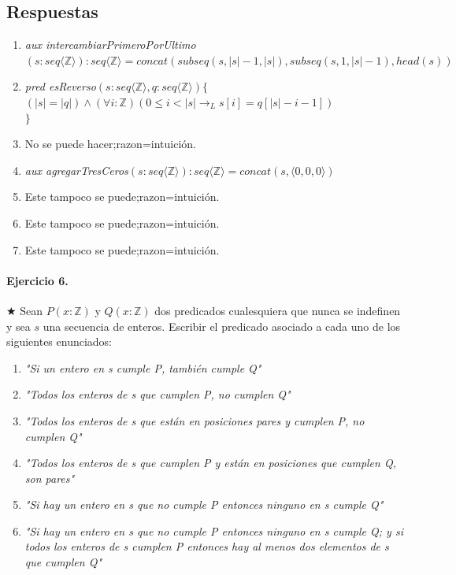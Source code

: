 \documentclass[a4paper]{article}
\begin{document}
\subsection*{Respuestas}
\begin{enumerate}[label=\alph*)]
\item \textit{aux intercambiarPrimeroPorUltimo}$(s: seq\langle \mathbb{Z} \rangle):seq\langle \mathbb{Z} \rangle = concat(subseq(s,|s|-1,|s|),subseq(s,1,|s|-1),head(s))$ 
\item \textit{pred esReverso}$(s: seq\langle \mathbb{Z} \rangle , q:seq\langle \mathbb{Z} \rangle)\{$\\
\hspace*{6mm}$(|s| = |q| )\wedge (\forall i:\mathbb{Z})(0\leq i<\vert s\vert \rightarrow_L s[i]=q[\vert s\vert-i-1])$\\
$\}$
\item No se puede hacer;razon=intuición.
\item \textit{aux agregarTresCeros}$(s: seq\langle \mathbb{Z} \rangle):seq\langle \mathbb{Z} \rangle=concat(s,\langle 0,0,0 \rangle)$

\item Este tampoco se puede;razon=intuición.
\item Este tampoco se puede;razon=intuición.
\item Este tampoco se puede;razon=intuición.
\end{enumerate}
\paragraph{Ejercicio 6.} $\bigstar$ Sean $P(x:\mathbb{Z})$ y $Q(x:\mathbb{Z})$ dos predicados cualesquiera que nunca se indefinen y sea $s$ una secuencia de enteros. Escribir el predicado asociado a cada uno de los siguientes enunciados:
\begin{enumerate}[label=\alph*)]
\item \textit{"Si un entero en s cumple P, también cumple Q"}
\item \textit{"Todos los enteros de s que cumplen P, no cumplen Q"}
\item \textit{"Todos los enteros de s que están en posiciones pares y cumplen P, no cumplen Q"}
\item \textit{"Todos los enteros de s que cumplen P y están en posiciones que cumplen Q, son pares"}
\item \textit{"Si hay un entero en s que no cumple P entonces ninguno en s cumple Q"}
\item \textit{"Si hay un entero en s que no cumple P entonces ninguno en s cumple Q; y si todos los enteros de s cumplen P entonces hay al menos dos elementos de s que cumplen Q"}
\end{enumerate}
\end{document}
